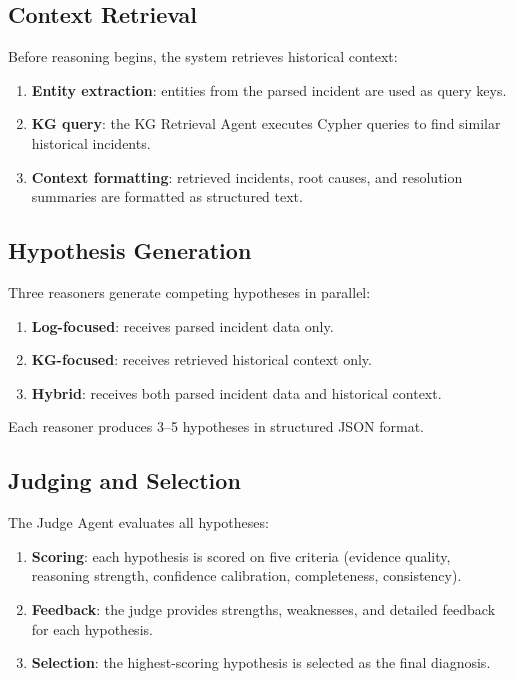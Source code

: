 \subsection{Context Retrieval}
Before reasoning begins, the system retrieves historical context:
\begin{enumerate}
  \item \textbf{Entity extraction}: entities from the parsed incident are used as query keys.
  \item \textbf{KG query}: the KG Retrieval Agent executes Cypher queries to find similar
        historical incidents.
  \item \textbf{Context formatting}: retrieved incidents, root causes, and resolution summaries
        are formatted as structured text.
\end{enumerate}

\subsection{Hypothesis Generation}
Three reasoners generate competing hypotheses in parallel:
\begin{enumerate}
  \item \textbf{Log-focused}: receives parsed incident data only.
  \item \textbf{KG-focused}: receives retrieved historical context only.
  \item \textbf{Hybrid}: receives both parsed incident data and historical context.
\end{enumerate}
Each reasoner produces 3--5 hypotheses in structured JSON format.

\subsection{Judging and Selection}
The Judge Agent evaluates all hypotheses:
\begin{enumerate}
  \item \textbf{Scoring}: each hypothesis is scored on five criteria (evidence quality, reasoning
        strength, confidence calibration, completeness, consistency).
  \item \textbf{Feedback}: the judge provides strengths, weaknesses, and detailed feedback for
        each hypothesis.
  \item \textbf{Selection}: the highest-scoring hypothesis is selected as the final diagnosis.
\end{enumerate}

